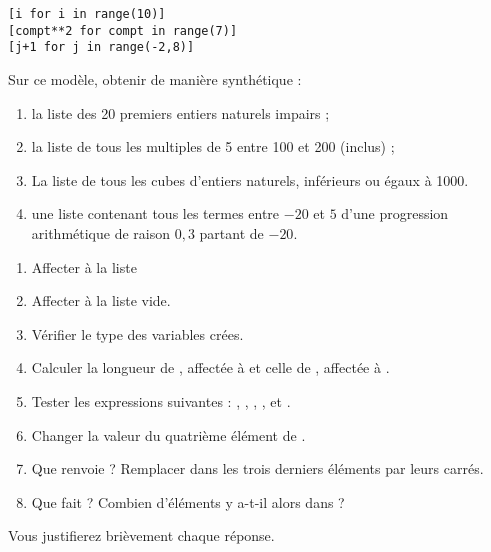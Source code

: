 \begin{lstlisting}
[i for i in range(10)]
[compt**2 for compt in range(7)]
[j+1 for j in range(-2,8)]
\end{lstlisting}
Sur ce modèle, obtenir de manière synthétique : 
\begin{enumerate}[label=\emph{\alph*)}]
  \item la liste des 20 premiers entiers naturels impairs ;
  \item la liste de tous les multiples de 5 entre 100 et 200 (inclus) ;
  \item La liste de tous les cubes d'entiers naturels, inférieurs ou égaux à 1000. 
  \item une liste contenant tous les termes entre $-20$ et $5$ d'une progression arithmétique de raison $0,3$ partant de $-20$.
\end{enumerate}

\question{}
\begin{enumerate}[label = \emph{\alph*)}]
  \item Affecter à  la liste \pyv{[2,5,3,-1,7,2,1]}
  \item Affecter à  la liste vide.
  \item Vérifier le type des variables crées.
  \item Calculer la longueur de , affectée à  et celle de , affectée à .
  \item Tester les expressions suivantes : , , , ,  et .
  \item Changer la valeur du quatrième élément de .
  \item Que renvoie  ? Remplacer dans  les trois derniers éléments par leurs carrés.
  \item Que fait  ? Combien d'éléments y a-t-il alors dans  ?
\end{enumerate}


Vous justifierez brièvement chaque réponse. 

